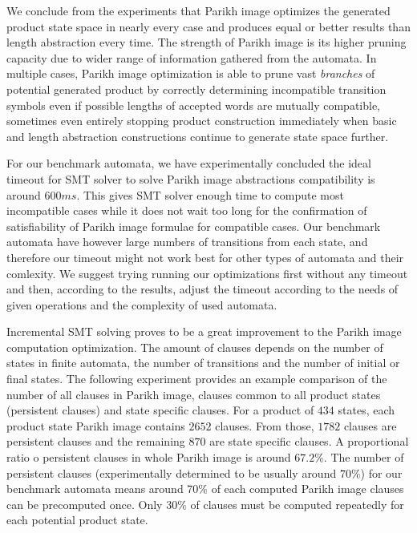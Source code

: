 
We conclude from the experiments that Parikh image optimizes the generated product state space in nearly every case and produces equal or better results than length abstraction every time. The strength of Parikh image is its higher pruning capacity due to wider range of information gathered from the automata. In multiple cases, Parikh image optimization is able to prune vast \emph{branches} of potential generated product by correctly determining incompatible transition symbols even if possible lengths of accepted words are mutually compatible, sometimes even entirely stopping product construction immediately when basic and length abstraction constructions continue to generate state space further.

For our benchmark automata, we have experimentally concluded the ideal timeout for SMT solver to solve Parikh image abstractions compatibility is around $600 ms$. This gives SMT solver enough time to compute most incompatible cases while it does not wait too long for the confirmation of satisfiability of Parikh image formulae for compatible cases. Our benchmark automata have however large numbers of transitions from each state, and therefore our timeout might not work best for other types of automata and their comlexity. We suggest trying running our optimizations first without any timeout and then, according to the results, adjust the timeout according to the needs of given operations and the complexity of used automata.

Incremental SMT solving proves to be a great improvement to the Parikh image computation optimization. The amount of clauses depends on the number of states in finite automata, the number of transitions and the number of initial or final states. The following experiment provides an example comparison of the number of all clauses in Parikh image, clauses common to all product states (persistent clauses) and state specific clauses. For a product of $434$ states, each product state Parikh image contains $2652$ clauses. From those, $1782$ clauses are persistent clauses and the remaining $870$ are state specific clauses. A proportional ratio o persistent clauses in whole Parikh image is around $67.2 \%$. The number of persistent clauses (experimentally determined to be usually around $70 \%$) for our benchmark automata means around $70\%$ of each computed Parikh image clauses can be precomputed once. Only $30\%$ of clauses must be computed repeatedly for each potential product state.


